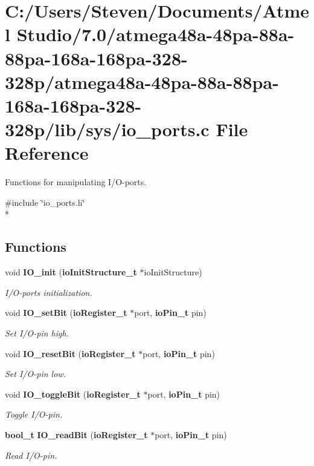 \section{C\+:/\+Users/\+Steven/\+Documents/\+Atmel Studio/7.0/atmega48a-\/48pa-\/88a-\/88pa-\/168a-\/168pa-\/328-\/328p/atmega48a-\/48pa-\/88a-\/88pa-\/168a-\/168pa-\/328-\/328p/lib/sys/io\+\_\+ports.c File Reference}
\label{io__ports_8c}


Functions for manipulating I/\+O-\/ports.  


{\ttfamily \#include \char`\"{}io\+\_\+ports.\+h\char`\"{}}\\*
\subsection*{Functions}
\begin{DoxyCompactItemize}
\item 
void {\bf I\+O\+\_\+init} ({\bf io\+Init\+Structure\+\_\+t} $\ast$io\+Init\+Structure)
\begin{DoxyCompactList}\small\item\em I/\+O-\/ports initialization. \end{DoxyCompactList}\item 
void {\bf I\+O\+\_\+set\+Bit} ({\bf io\+Register\+\_\+t} $\ast$port, {\bf io\+Pin\+\_\+t} pin)
\begin{DoxyCompactList}\small\item\em Set I/\+O-\/pin high. \end{DoxyCompactList}\item 
void {\bf I\+O\+\_\+reset\+Bit} ({\bf io\+Register\+\_\+t} $\ast$port, {\bf io\+Pin\+\_\+t} pin)
\begin{DoxyCompactList}\small\item\em Set I/\+O-\/pin low. \end{DoxyCompactList}\item 
void {\bf I\+O\+\_\+toggle\+Bit} ({\bf io\+Register\+\_\+t} $\ast$port, {\bf io\+Pin\+\_\+t} pin)
\begin{DoxyCompactList}\small\item\em Toggle I/\+O-\/pin. \end{DoxyCompactList}\item 
{\bf bool\+\_\+t} {\bf I\+O\+\_\+read\+Bit} ({\bf io\+Register\+\_\+t} $\ast$port, {\bf io\+Pin\+\_\+t} pin)
\begin{DoxyCompactList}\small\item\em Read I/\+O-\/pin. \end{DoxyCompactList}\end{DoxyCompactItemize}


